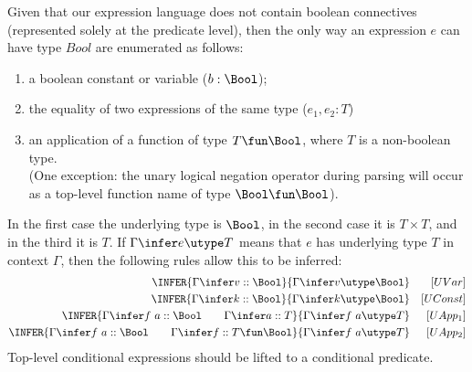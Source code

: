 Given that our expression language does not contain boolean connectives
(represented solely at the predicate level),
then the only way an expression $e$ can have type $Bool$ are enumerated as follows:
\begin{enumerate}
  \item a boolean constant or variable ($b:\Bool$);
  \item the equality of two expressions of the same type ($e_1,e_2:T$)
  \item an application of a function of type $T \fun \Bool$,
        where $T$ is a non-boolean type.
        \\(One exception: the unary logical negation operator
           during parsing will occur as a top-level function name
           of type $\Bool\fun\Bool$).
\end{enumerate}
In the first case the underlying type is $\Bool$,
in the second case it is $T \times T$, and in the third it is $T$.
If $\Gamma \infer e \utype T$ means that $e$ has underlying type $T$
in context $\Gamma$, then the following rules allow this to be inferred:
\begin{eqnarray*}
   \INFER%
     {\Gamma \infer v :: \Bool}
     {\Gamma \infer v \utype \Bool} && [UVar]
\\ \INFER%
     {\Gamma \infer k :: \Bool}
     {\Gamma \infer k \utype \Bool} && [UConst]
\\ \INFER%
     {\Gamma \infer f~a :: \Bool \qquad \Gamma \infer a :: T }
     {\Gamma \infer f~a \utype T} && [UApp_1]
\\ \INFER%
     {\Gamma \infer f~a :: \Bool \qquad \Gamma \infer f :: T \fun \Bool}
     {\Gamma \infer f~a \utype T} && [UApp_2]
\end{eqnarray*}
Top-level conditional expressions should be lifted to
a conditional predicate.
